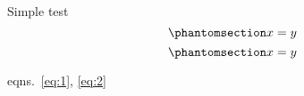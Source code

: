 Simple test
\begin{equation}\protect\phantomsection\label{eq:1}{x=y}\end{equation}
\begin{equation}\protect\phantomsection\label{eq:2}{x=y}\end{equation}

eqns.~\ref{eq:1}, \ref{eq:2}
